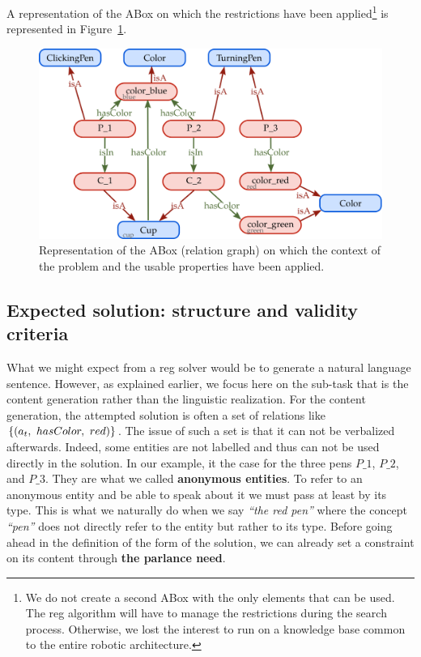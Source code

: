 A representation of the ABox on which the restrictions have been applied\footnote{We do not create a second ABox with the only elements that can be used. The \acrshort{reg} algorithm will have to manage the restrictions during the search process. Otherwise, we lost the interest to run on a knowledge base common to the entire robotic architecture.} is represented in Figure~\ref{fig:chap4_kb_ctx}.

\begin{figure}[ht!]
\centering
\includegraphics[scale=0.38]{figures/chapter4/pens_ctx.png}
\caption{\label{fig:chap4_kb_ctx} Representation of the ABox (relation graph) on which the context of the problem and the usable properties have been applied. }
\end{figure}

\subsection{Expected solution: structure and validity criteria}

What we might expect from a \acrshort{reg} solver would be to generate a natural language sentence. However, as explained earlier, we focus here on the sub-task that is the content generation rather than the linguistic realization. For the content generation, the attempted solution is often a set of relations like $\{ (a_t,\ hasColor,\ red)\}$. The issue of such a set is that it can not be verbalized afterwards. Indeed, some entities are not labelled and thus can not be used directly in the solution. In our example, it the case for the three pens $P\_1$, $P\_2$, and $P\_3$. They are what we called \textbf{anonymous entities}. To refer to an anonymous entity and be able to speak about it we must pass at least by its type. This is what we naturally do when we say \textit{``the red pen''} where the concept \textit{``pen''} does not directly refer to the entity but rather to its type. Before going ahead in the definition of the form of the solution, we can already set a constraint on its content through \textbf{the parlance need}.


